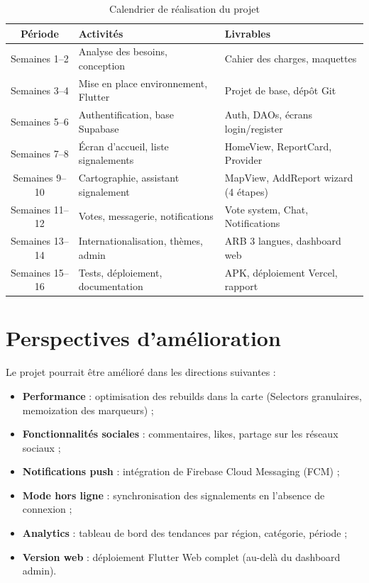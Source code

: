 \documentclass[12pt,a4paper]{report}
\begin{document}
\begin{table}[H]
    \centering
    \begin{tabular}{|c|l|l|}
        \hline
        \rowcolor{supnumgreen!20}
        \textbf{Période} & \textbf{Activités} & \textbf{Livrables} \\
        \hline
        Semaines 1--2 & Analyse des besoins, conception & Cahier des charges, maquettes \\
        \hline
        Semaines 3--4 & Mise en place environnement, Flutter & Projet de base, dépôt Git \\
        \hline
        Semaines 5--6 & Authentification, base Supabase & Auth, DAOs, écrans login/register \\
        \hline
        Semaines 7--8 & Écran d'accueil, liste signalements & HomeView, ReportCard, Provider \\
        \hline
        Semaines 9--10 & Cartographie, assistant signalement & MapView, AddReport wizard (4 étapes) \\
        \hline
        Semaines 11--12 & Votes, messagerie, notifications & Vote system, Chat, Notifications \\
        \hline
        Semaines 13--14 & Internationalisation, thèmes, admin & ARB 3 langues, dashboard web \\
        \hline
        Semaines 15--16 & Tests, déploiement, documentation & APK, déploiement Vercel, rapport \\
        \hline
    \end{tabular}
    \caption{Calendrier de réalisation du projet}
    \label{tab:calendar}
\end{table}

\section{Perspectives d'amélioration}

Le projet pourrait être amélioré dans les directions suivantes :

\begin{itemize}
    \item \textbf{Performance} : optimisation des rebuilds dans la carte (Selectors granulaires, memoization des marqueurs) ;
    \item \textbf{Fonctionnalités sociales} : commentaires, likes, partage sur les réseaux sociaux ;
    \item \textbf{Notifications push} : intégration de Firebase Cloud Messaging (FCM) ;
    \item \textbf{Mode hors ligne} : synchronisation des signalements en l'absence de connexion ;
    \item \textbf{Analytics} : tableau de bord des tendances par région, catégorie, période ;
    \item \textbf{Version web} : déploiement Flutter Web complet (au-delà du dashboard admin).
\end{itemize}
\end{document}
